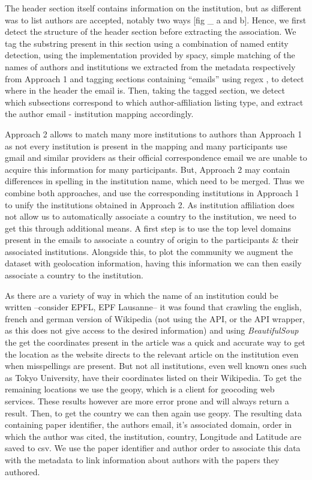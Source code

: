 \documentclass[journal,twocolumn]{IEEEtran}
\begin{document}
The header section itself contains information on the institution, but
as different was to list authors are accepted, notably two ways {[}fig
\_ a and b{]}. Hence, we first detect the structure of the header
section before extracting the association. We tag the substring present
in this section using a combination of named entity detection, using the
implementation provided by spacy, simple matching of the names of
authors and institutions we extracted from the metadata respectively
from Approach 1 and tagging sections containing ``emails'' using regex ,
to detect where in the header the email is. Then, taking the tagged
section, we detect which subsections correspond to which
author-affiliation listing type, and extract the author email -
institution mapping accordingly.

Approach 2 allows to match many more institutions to authors than
Approach 1 as not every institution is present in the mapping and many
participants use gmail and similar providers as their official
correspondence email we are unable to acquire this information for many
participants. But, Approach 2 may contain differences in spelling in the
institution name, which need to be merged. Thus we combine both
approaches, and use the corresponding institutions in Approach 1 to
unify the institutions obtained in Approach 2. As institution
affiliation does not allow us to automatically associate a country to
the institution, we need to get this through additional means. A first
step is to use the top level domains present in the emails to associate
a country of origin to the participants \& their associated
institutions. Alongside this, to plot the community we augment the
dataset with geolocation information, having this information we can
then easily associate a country to the institution.

As there are a variety of way in which the name of an institution could
be written --consider EPFL, EPF Lausanne-- it was found that crawling
the english, french and german version of Wikipedia (not using the API,
or the API wrapper, as this does not give access to the desired
information) and using \emph{BeautifulSoup} the get the coordinates
present in the article was a quick and accurate way to get the location
as the website directs to the relevant article on the institution even
when misspellings are present. But not all institutions, even well known
ones such as Tokyo University, have their coordinates listed on their
Wikipedia. To get the remaining locations we use the geopy, which is a
client for geocoding web services. These results however are more error
prone and will always return a result. Then, to get the country we can
then again use geopy. The resulting data containing paper identifier,
the authors email, it's associated domain, order in which the author was
cited, the institution, country, Longitude and Latitude are saved to
csv. We use the paper identifier and author order to associate this data
with the metadata to link information about authors with the papers they
authored.
\end{document}
